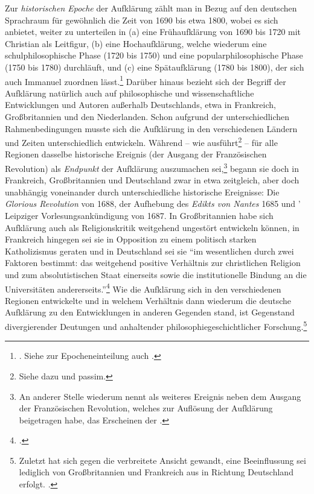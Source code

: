 Zur \emph{historischen Epoche} der Aufklärung zählt man in Bezug auf den deutschen
Sprachraum für gewöhnlich die Zeit von 1690 bis etwa 1800, wobei es sich
anbietet, weiter zu unterteilen in (a) eine Frühaufklärung von 1690 bis 1720 mit
Christian  als Leitfigur, (b) eine Hochaufklärung, welche
wiederum eine schulphilosophische Phase (1720 bis
1750) und eine popularphilosophische Phase (1750 bis 1780) durchläuft, und (c)
eine Spätaufklärung (1780 bis 1800), der sich auch Immanuel
 zuordnen lässt.\footnote{\cite[Vgl.][33]{Schneiders:HoffnungaufVernunft1990}.
Siehe zur Epocheneinteilung auch
\cite[][311]{Hinske:WolffsStellunginderdeutschenAufklaerung1986}.} Darüber
hinaus bezieht sich der Begriff der Aufklärung natürlich auch auf philosophische
und wissenschaftliche Entwicklungen und Autoren außerhalb Deutschlands, etwa in
Frankreich, Großbritannien und den Niederlanden. Schon aufgrund der
unterschiedlichen Rahmenbedingungen musste sich die Aufklärung in den
verschiedenen Ländern und Zeiten unterschiedlich
entwickeln. Während -- wie
ausführt\footnote{Siehe dazu
\cite[][16--18]{Schneiders:DasZeitalterderAufklaerung2005} und passim.} -- für
alle Regionen dasselbe historische Ereignis (der Ausgang der Französischen
Revolution) als \emph{Endpunkt} der Aufklärung auszumachen sei,\footnote{An
anderer Stelle wiederum nennt
 als weiteres
Ereignis neben dem Ausgang der Französischen Revolution, welches zur Auflösung
der Aufklärung beigetragen habe, das Erscheinen der 
\parencite[vgl.][263]{Schneiders:AufklaerungundVorurteilskritik1983}.} begann
sie doch in Frankreich, Großbritannien und Deutschland zwar in etwa zeitgleich, aber doch unabhängig voneinander durch unterschiedliche historische Ereignisse: Die
\emph{Glorious Revolution} von 1688, der Aufhebung des \emph{Edikts von Nantes}
1685 und ' Leipziger Vorlesungsankündigung von 1687.
In Großbritannien habe sich Aufklärung auch als Religionskritik weitgehend
ungestört entwickeln können, in Frankreich hingegen sei sie in Opposition zu
einem politisch starken Katholizismus geraten und in Deutschland sei sie
\enquote{im wesentlichen durch zwei Faktoren bestimmt: das weitgehend positive
Verhältnis zur christlichen Religion und zum absolutistischen Staat einerseits
sowie die institutionelle Bindung an die Universitäten
andererseits.}\footcite[][89]{Schneiders:DasZeitalterderAufklaerung2005}
Wie die Aufklärung sich in den verschiedenen Regionen entwickelte und in welchem
Verhältnis dann wiederum die deutsche Aufklärung zu den Entwicklungen in anderen
Gegenden stand, ist Gegenstand divergierender Deutungen und anhaltender
philosophiegeschichtlicher Forschung.\footnote{Zuletzt hat
 sich gegen die
verbreitete Ansicht gewandt, eine Beeinflussung sei lediglich von Großbritannien
und Frankreich aus in Richtung Deutschland erfolgt.
\cite[Vgl.][\pno~73\,f.]{CarbonciniGavanelli:DasParadoxderAufklaerung2007}.}


